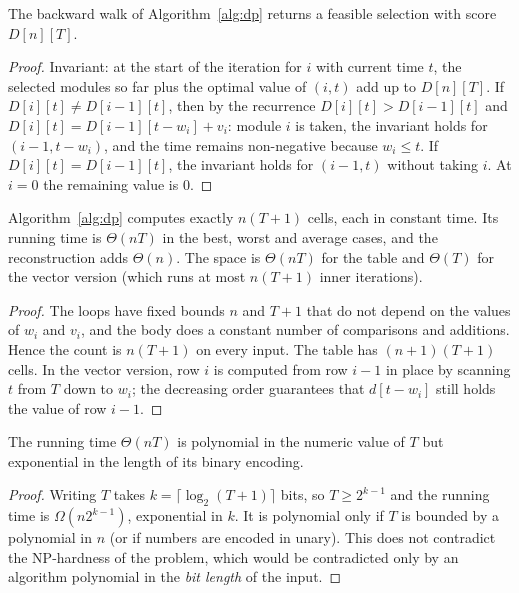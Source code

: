 \begin{lemma}[Reconstruction]\label{lem:reconstruction}
The backward walk of Algorithm~\ref{alg:dp} returns a feasible selection with score $D[n][T]$.
\end{lemma}
\begin{proof}
Invariant: at the start of the iteration for $i$ with current time $t$, the selected modules so far plus the optimal value of $(i,t)$ add up to $D[n][T]$. If $D[i][t]\neq D[i-1][t]$, then by the recurrence $D[i][t]>D[i-1][t]$ and $D[i][t]=D[i-1][t-w_i]+v_i$: module $i$ is taken, the invariant holds for $(i-1,t-w_i)$, and the time remains non-negative because $w_i\le t$. If $D[i][t]=D[i-1][t]$, the invariant holds for $(i-1,t)$ without taking $i$. At $i=0$ the remaining value is 0.
\end{proof}

\begin{theorem}\label{thm:dp}
Algorithm~\ref{alg:dp} computes exactly $n(T+1)$ cells, each in constant time. Its running time is $\Theta(nT)$ in the best, worst and average cases, and the reconstruction adds $\Theta(n)$. The space is $\Theta(nT)$ for the table and $\Theta(T)$ for the vector version (which runs at most $n(T+1)$ inner iterations).
\end{theorem}
\begin{proof}
The loops have fixed bounds $n$ and $T+1$ that do not depend on the values of $w_i$ and $v_i$, and the body does a constant number of comparisons and additions. Hence the count is $n(T+1)$ on every input. The table has $(n+1)(T+1)$ cells. In the vector version, row $i$ is computed from row $i-1$ in place by scanning $t$ from $T$ down to $w_i$; the decreasing order guarantees that $d[t-w_i]$ still holds the value of row $i-1$.
\end{proof}

\begin{proposition}\label{prop:pseudo}
The running time $\Theta(nT)$ is polynomial in the numeric value of $T$ but exponential in the length of its binary encoding.
\end{proposition}
\begin{proof}
Writing $T$ takes $k=\lceil\log_2(T+1)\rceil$ bits, so $T\ge 2^{k-1}$ and the running time is $\Omega(n2^{k-1})$, exponential in $k$. It is polynomial only if $T$ is bounded by a polynomial in $n$ (or if numbers are encoded in unary). This does not contradict the NP-hardness of the problem, which would be contradicted only by an algorithm polynomial in the \emph{bit length} of the input.
\end{proof}

